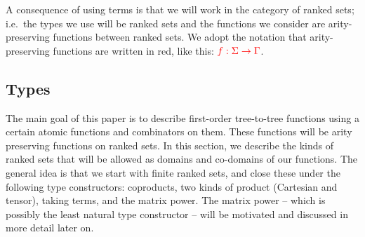A consequence of using terms is that we will work in the category of ranked sets; i.e.~the types we use will be ranked sets and the functions we consider are arity-preserving functions between ranked sets. We adopt the notation that arity-preserving functions are written in red, like this: ${\color{red}{f : \Sigma \to \Gamma}}$. 


\subsection{Types}
The  main goal of this paper is to  describe first-order tree-to-tree functions using a certain atomic functions and combinators on them. These functions will be arity preserving functions on ranked sets. In this section, we describe the kinds of ranked sets that will be allowed as domains and co-domains of our functions. The general idea is that we start with finite ranked sets, and close these under the following type constructors: coproducts, two kinds of product (Cartesian and tensor), taking terms, and the matrix power. 
The  matrix power -- which is possibly the least natural type constructor -- will be motivated and discussed in more detail later on.


